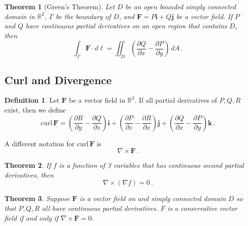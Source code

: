 \documentclass[
]{article}
\newtheorem{theorem}{Theorem}[section]
\theoremstyle{definition}
\newtheorem{definition}{Definition}[section]
\theoremstyle{definition}
\theoremstyle{definition}
\theoremstyle{definition}
\theoremstyle{remark}
\begin{document}
\begin{theorem}[Green's Theorem]
Let \(D\) be an open bounded simply connected domain in \(\mathbb{R}^2\),
\(\Gamma\) be the boundary of \(D\),
and \(\mathbf{F} = P\mathbf{i} + Q \mathbf{j}\) be a vector field.
If \(P\) and \(Q\) have continuous partial derivatives on an open region
that contains \(D\), then
\begin{equation*}
    \int_\Gamma \mathbf{F} \cdot d \ell  = \iint_D \left( \frac{\partial Q}{\partial x} - \frac{\partial P}{\partial y} \right) \, dA \,.
\end{equation*}
\end{theorem}

\subsection{Curl and Divergence}\label{curl-and-divergence}

\begin{definition}
Let \(\mathbf{F}\) be a vector field in \(\mathbb{R}^3\).
If all partial derivatives of \(P,Q,R\) exist, then we define
\begin{equation*}
    \mathrm{curl}\,\mathbf{F} =  \left( \frac{\partial R}{\partial y} - \frac{\partial Q}{\partial z} \right) \mathbf{i}
                       + \left( \frac{\partial P}{\partial z} - \frac{\partial R}{\partial x}  \right)  \mathbf{j}
                         + \left( \frac{\partial Q}{\partial x} - \frac{\partial P}{\partial y}  \right) \mathbf{k} \,.
\end{equation*}
\end{definition}

A different notation for \(\mathrm{curl} \, \mathbf{F}\) is
\begin{equation*}
    \nabla \times \mathbf{F} \,.
\end{equation*}

\begin{theorem}
If \(f\) is a function of 3 variables that has continuous second partial derivatives, then
\begin{equation*}
    \nabla \times ( \nabla f) = 0 \,.
\end{equation*}
\end{theorem}

\begin{theorem}
Suppose \(\mathbf{F}\) is a vector field on and simply connected domain \(D\) so that \(P,Q,R\)
all have continuous partial derivatives.
\(F\) is a conservative vector field if and only if
\(\nabla \times \mathbf{F} = 0\).
\end{theorem}
\end{document}
